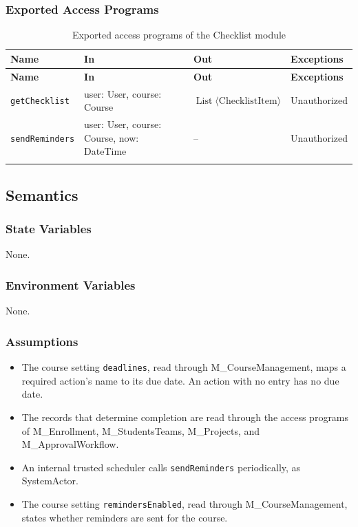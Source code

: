 \documentclass[12pt, titlepage]{article}
\begin{document}
\subsubsection{Exported Access Programs}

\begingroup
\small
\setlength{\tabcolsep}{4pt}
\renewcommand{\arraystretch}{1.2}
\begin{longtable}{>{\raggedright\arraybackslash}p{}
        >{\raggedright\arraybackslash}p{}
        >{\raggedright\arraybackslash}p{}
        >{\raggedright\arraybackslash}p{}}
    \toprule
    \textbf{Name} & \textbf{In} & \textbf{Out} & \textbf{Exceptions} \\
    \midrule
    \endfirsthead
    \toprule
    \textbf{Name} & \textbf{In} & \textbf{Out} & \textbf{Exceptions} \\
    \midrule
    \endhead
    \endfoot
    \texttt{getChecklist} & user: User, course: Course & $\operatorname{List}\langle\text{ChecklistItem}\rangle$ & Unauthorized \\
    \texttt{sendReminders} & user: User, course: Course, now: DateTime & -- & Unauthorized \\
    \bottomrule
    \caption{Exported access programs of the Checklist module}
    \label{TblChecklistAccessPrograms}
\end{longtable}
\endgroup

\subsection{Semantics}

\subsubsection{State Variables}
None.

\subsubsection{Environment Variables}
None.

\subsubsection{Assumptions}

\begin{itemize}
    \item The course setting \texttt{deadlines}, read through M\_CourseManagement,
    maps a required action's name to its due date. An action with no entry has no due date.
    \item The records that determine completion are read through the access programs
    of M\_Enrollment, M\_StudentsTeams, M\_Projects, and M\_ApprovalWorkflow.
    \item An internal trusted scheduler calls \texttt{sendReminders} periodically, as SystemActor.
    \item The course setting \texttt{remindersEnabled}, read through M\_CourseManagement,
    states whether reminders are sent for the course.
\end{itemize}
\end{document}
